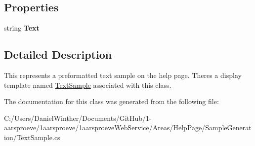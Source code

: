 \subsection*{Properties}
\begin{DoxyCompactItemize}
\item 
\hypertarget{class__1aarsproeve_web_service_1_1_areas_1_1_help_page_1_1_text_sample_af691a0f912794fd1c606e7d0fa73dbee}{}string {\bfseries Text}\label{class__1aarsproeve_web_service_1_1_areas_1_1_help_page_1_1_text_sample_af691a0f912794fd1c606e7d0fa73dbee}

\end{DoxyCompactItemize}


\subsection{Detailed Description}
This represents a preformatted text sample on the help page. There\textquotesingle{}s a display template named \hyperlink{class__1aarsproeve_web_service_1_1_areas_1_1_help_page_1_1_text_sample}{Text\+Sample} associated with this class. 



The documentation for this class was generated from the following file\+:\begin{DoxyCompactItemize}
\item 
C\+:/\+Users/\+Daniel\+Winther/\+Documents/\+Git\+Hub/1-\/aarsproeve/1aarsproeve/1aarsproeve\+Web\+Service/\+Areas/\+Help\+Page/\+Sample\+Generation/Text\+Sample.\+cs\end{DoxyCompactItemize}
